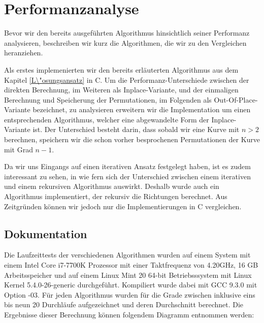 \documentclass[course=asp]{aspdoc}
\begin{document}
\newpage
\section{Performanzanalyse} \label{Performanzanalyse}
Bevor wir den bereits ausgef\"uhrten Algorithmus hinsichtlich seiner Performanz analysieren, beschreiben wir kurz die Algorithmen, die wir zu den Vergleichen heranziehen.

Als erstes implemenierten wir den bereits erl\"auterten Algorithmus aus dem Kapitel \ref{L\"osungsansatz} in C. Um die Performanz-Unterschiede zwischen der direkten Berechnung, im Weiteren als Inplace-Variante, und der einmaligen Berechnung und Speicherung der Permutationen, im Folgenden als Out-Of-Place-Variante bezeichnet, zu analysieren erweitern wir die Implementation um einen entsprechenden Algorithmus, welcher eine abgewandelte Form der Inplace-Variante ist. Der Unterschied besteht darin, dass sobald wir eine Kurve mit $n > 2$ berechnen, speichern wir die schon vorher besprochenen Permutationen der Kurve mit Grad $n - 1$. 

Da wir uns Eingangs auf einen iterativen Ansatz festgelegt haben, ist es zudem interessant zu sehen, in wie fern sich der Unterschied zwischen einem iterativen und einem rekursiven Algorithmus auswirkt. Deshalb wurde auch ein Algorithmus implementiert, der rekursiv die Richtungen berechnet. Aus Zeitgr\"unden k\"onnen wir jedoch nur die Implementierungen in C vergleichen. 

\subsection{Dokumentation}

Die Laufzeittests der verschiedenen Algorithmen wurden auf einem System mit einem Intel Core i7-7700K Prozessor mit einer Taktfrequenz von 4.20GHz, 16 GB Arbeitsspeicher und auf einem Linux Mint 20 64-bit Betriebsssystem mit Linux Kernel 5.4.0-26-generic durchgef\"uhrt. Kompiliert wurde dabei mit GCC 9.3.0 mit Option -03.
F\"ur jeden Algorithmus wurden f\"ur die Grade zwischen inklusive eins bis neun 20 Durchl\"aufe aufgezeichnet und deren Durchschnitt berechnet. Die Ergebnisse dieser Berechnung k\"onnen folgendem Diagramm entnommen werden:

\newpage
\end{document}
